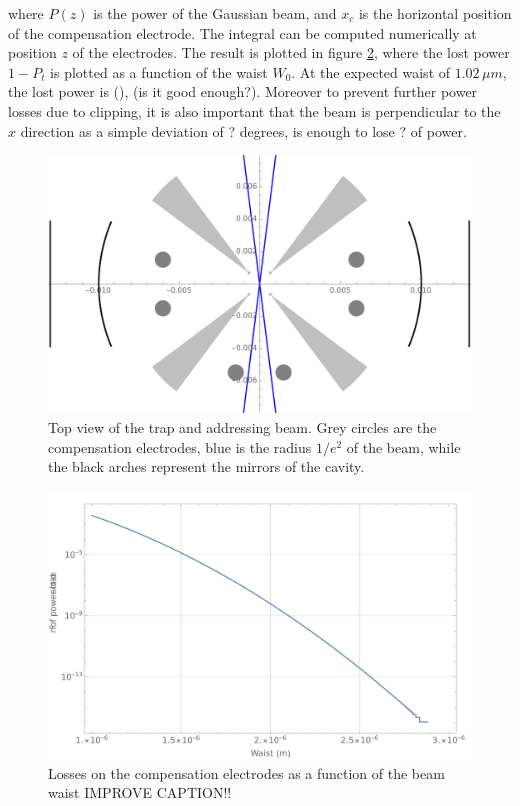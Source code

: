 where $P(z)$ is the power of the Gaussian beam, and $x_c$ is the horizontal position of the compensation electrode. The integral can be computed numerically at position $z$ of the electrodes. The result is plotted in figure \ref{lossesplot}, where the lost power $1-P_{t}$ is plotted as a function of the waist $W_0$. At the expected waist of $1.02\,\mu m$, the lost power is (), (is it good enough?). Moreover to prevent further power losses due to clipping, it is also important that the beam is perpendicular to the $x$ direction as a simple deviation of ? degrees, is enough to lose ? of power.
\begin{figure}
     \centering

     \includegraphics[width=.8\textwidth]{img/clipping}
     \caption{Top view of the trap and addressing beam. Grey circles are the compensation electrodes, blue is the radius $1/e^2$ of the beam, while the black arches represent the mirrors of the cavity.}
     \label{clippingtop}
     \end{figure}
\begin{figure}
      \centering
        \includegraphics[width=.8\textwidth]{img/clipping2}
        \caption{Losses on the compensation electrodes as a function of the beam waist IMPROVE CAPTION!!}
        \label{lossesplot}

\end{figure}



